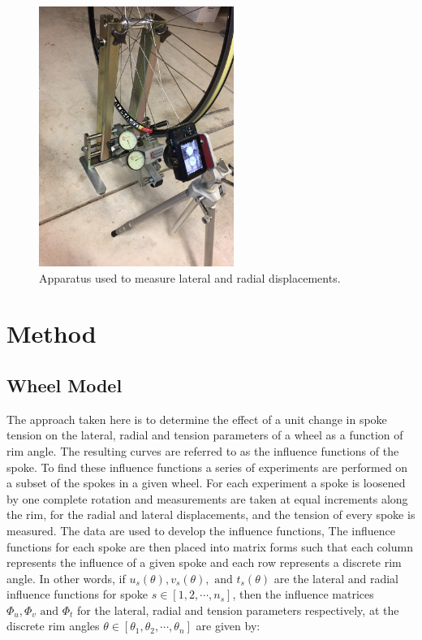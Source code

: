 \documentclass[journal]{IEEEtran}
\begin{document}
\begin{figure}[!t]
\centering
\includegraphics[width=2.5in,angle=-90]{./imgs/apparat.jpg}
\caption{Apparatus used to measure lateral and radial displacements.}
\label{fig:apparatus}
\end{figure}

\section{Method}

\subsection{Wheel Model}
The approach taken here is to determine the effect of a unit change in spoke tension on the lateral, radial and tension parameters of a wheel as a function of rim angle.  The resulting curves are referred to as the influence functions of the spoke. To find these influence functions a series of experiments are performed on a subset of the spokes in a given wheel.  For each experiment a spoke is loosened by one complete rotation and measurements are taken at equal increments along the rim, for the radial and lateral displacements, and the tension of every spoke is measured. The data are used to develop the influence functions, The influence functions for each spoke are then placed into matrix forms such that each column represents the influence of a given spoke and each row represents a discrete rim angle.  In other words, if $u_s (\theta), v_s(\theta), \text{ and }t_s(\theta)$ are the lateral and radial influence functions for spoke $s \in [1,2, \cdots , n_s]$, then the influence matrices $\Phi_u, \Phi_v \text{ and } \Phi_t$  for the lateral, radial and tension parameters respectively, at the discrete rim angles $\theta \in [\theta_1,\theta_2,\cdots, \theta_n]$ are given by:
\end{document}
